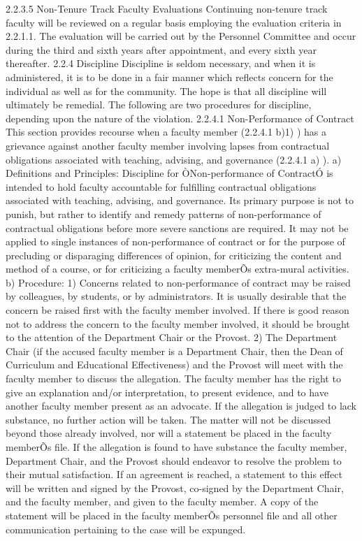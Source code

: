 \documentclass[letterpaper, 11pt]{article}
\begin{document}
	2.2.3.5 Non-Tenure Track Faculty Evaluations
	Continuing non-tenure track faculty will be reviewed on a regular basis employing the evaluation criteria in 2.2.1.1.  The evaluation will be carried out by the Personnel Committee and occur during the third and sixth years after appointment, and every sixth year thereafter.
	2.2.4 Discipline
	Discipline is seldom necessary, and when it is administered, it is to be done in a fair manner which reflects concern for the individual as well as for the community.  The hope is that all discipline will ultimately be remedial.  The following are two procedures for discipline, depending upon the nature of the violation.
	2.2.4.1 Non-Performance of Contract
	This section provides recourse when a faculty member (2.2.4.1 b)1) ) has a grievance against another faculty member involving lapses from contractual obligations associated with teaching, advising, and governance (2.2.4.1 a) ).
	a) Definitions and Principles:
	Discipline for ÒNon-performance of ContractÓ is intended to hold faculty accountable for fulfilling contractual obligations associated with teaching, advising, and governance.  Its primary purpose is not to punish, but rather to identify and remedy patterns of non-performance of contractual obligations before more severe sanctions are required.
	It may not be applied to single instances of non-performance of contract or for the purpose of precluding or disparaging differences of opinion, for criticizing the content and method of a course, or for criticizing a faculty memberÕs extra-mural activities.
	b) Procedure:
	1) Concerns related to non-performance of contract may be raised by colleagues, by students, or by administrators.  It is usually desirable that the concern be raised first with the faculty member involved.  If there is good reason not to address the concern to the faculty member involved, it should be brought to the attention of the Department Chair or the Provost.
	2) The Department Chair (if the accused faculty member is a Department Chair, then the Dean of Curriculum and Educational Effectiveness) and the Provost will meet with the faculty member to discuss the allegation.  The faculty member has the right to give an explanation and/or interpretation, to present evidence, and to have another faculty member present as an advocate.  If the allegation is judged to lack substance, no further action will be taken.  The matter will not be discussed beyond those already involved, nor will a statement be placed in the faculty memberÕs file.  If the allegation is found to have substance the faculty member, Department Chair, and the Provost should endeavor to resolve the problem to their mutual satisfaction.  If an agreement is reached, a statement to this effect will be written and signed by the Provost, co-signed by the Department Chair, and the faculty member, and given to the faculty member.  A copy of the statement will be placed in the faculty memberÕs personnel file and all other communication pertaining to the case will be expunged.
\end{document}
